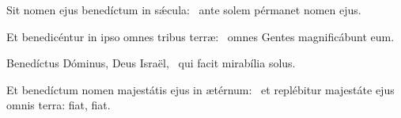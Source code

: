 \item Sit nomen ejus benedíctum in sǽcula:~\psstar{} ante solem pérmanet nomen ejus.

\item Et benedicéntur in ipso omnes tribus terræ:~\psstar{} omnes Gentes magnificábunt eum.

\item Benedíctus Dóminus, Deus Israël,~\psstar{} qui facit mirabília solus.

\item Et benedíctum nomen majestátis ejus in ætérnum:~\psstar{} et replébitur majestáte ejus omnis terra: fiat, fiat.

